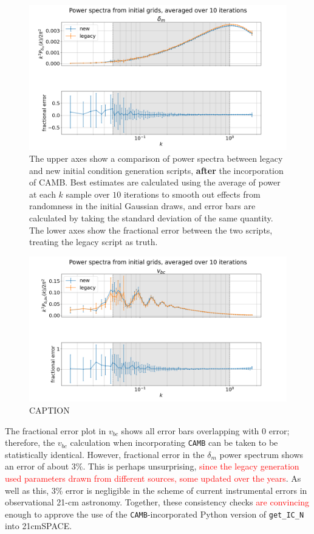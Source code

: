 \documentclass[floats,floatfix,showpacs,amssymb,prd,superscriptaddress,nofootinbib]{revtex4-2} %
\newcommand{\code}{\texttt}
\newcommand{\red}{\textcolor{red}}
\begin{document}
\newpage
\begin{figure}[H]
    \centering
    \includegraphics[width=0.9\columnwidth]{images/ic_power_spectra/compare_generators_averaged_power_spectra_with_residual_delta_m.png}
    \caption{The upper axes show a comparison of power spectra between legacy and new initial condition generation scripts, \textbf{after} the incorporation of CAMB. Best estimates are calculated using the average of power at each $k$ sample over $10$ iterations to smooth out effects from randomness in the initial Gaussian draws, and error bars are calculated by taking the standard deviation of the same quantity. The lower axes show the fractional error between the two scripts, treating the legacy script as truth.}
    \label{fig:compare_generators_power_spectrum_delta_m}
\end{figure}

\begin{figure}[H]
    \centering
    \includegraphics[width=0.9\columnwidth]{images/ic_power_spectra/compare_generators_averaged_power_spectra_with_residual_v_bc.png}
    \caption{CAPTION}
    \label{fig:compare_generators_power_spectrum_vbc}
\end{figure}

\newpage
The fractional error plot in $v_{bc}$ shows all error bars overlapping with $0$ error; therefore, the $v_{bc}$ calculation when incorporating \code{CAMB} can be taken to be statistically identical. However, fractional error in the $\delta_m$ power spectrum shows an error of about $3 \%$. This is perhaps unsurprising, \red{since the legacy generation used parameters drawn from different sources, some updated over the years}. As well as this, $3 \%$ error is negligible in the scheme of current instrumental errors in observational 21-cm astronomy. Together, these consistency checks \red{are convincing} enough to approve the use of the \code{CAMB}-incorporated Python version of \code{get\_IC\_N} into 21cmSPACE.
\end{document}
